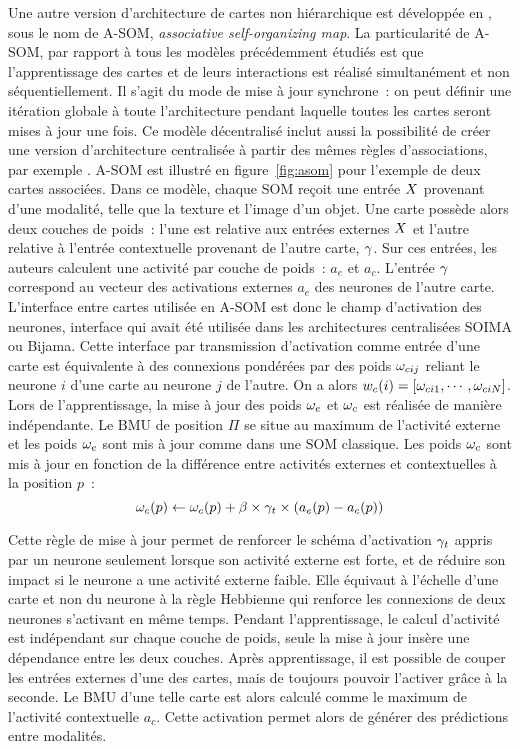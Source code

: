 \documentclass[../main]{subfiles}
\begin{document}
Une autre version d'architecture de cartes non hiérarchique est développée en \cite{johnsson_associating_2008,johnsson_associative_2009}, sous le nom de A-SOM, \emph{associative self-organizing map}. 
La particularité de A-SOM, par rapport à tous les modèles précédemment étudiés est que l'apprentissage des cartes et de leurs interactions est réalisé simultanément et non séquentiellement. Il s'agit du mode de mise à jour synchrone~: on peut définir une itération globale à toute l'architecture pendant laquelle toutes les cartes seront mises à jour une fois.
Ce modèle décentralisé inclut aussi la possibilité de créer une version d'architecture centralisée à partir des mêmes règles d'associations, par exemple \cite{buonamente_hierarchies_2016}. A-SOM est illustré en figure~\ref{fig:asom} pour l'exemple de deux cartes associées. 
Dans ce modèle, chaque SOM reçoit une entrée $X$ provenant d'une modalité, telle que la texture et l'image d'un objet.
Une carte possède alors deux couches de poids~: l'une est relative aux entrées externes $X$ et l'autre relative à l'entrée contextuelle provenant de l'autre carte, $\gamma$.
Sur ces entrées, les auteurs calculent une activité par couche de poids~: $a_e$ et $a_c$.
L'entrée $\gamma$ correspond au vecteur des activations externes $a_e$ des neurones de l'autre carte.
L'interface entre cartes utilisée en A-SOM est donc le champ d'activation des neurones, interface qui avait été utilisée dans les architectures centralisées SOIMA ou Bijama. Cette interface par transmission d'activation comme entrée d'une carte est équivalente à des connexions pondérées par des poids $\omega_{cij}$ reliant le neurone $i$ d'une carte au neurone $j$ de l'autre. On a alors $w_c(i) = [\omega_{ci1}, \cdots, \omega_{ciN}]$.
Lors de l'apprentissage, la mise à jour des poids $\omega_e$ et $\omega_c$ est réalisée de manière indépendante. 
Le BMU de position $\Pi$ se situe au maximum de l'activité externe et les poids $\omega_e$ sont mis à jour comme dans une SOM classique.
Les poids $\omega_c$ sont mis à jour en fonction de la différence entre activités externes et contextuelles à la position $p$~:
$$ \omega_c(p) \leftarrow \omega_c(p) + \beta \times \gamma_t \times (a_e(p) - a_c(p))$$

Cette règle de mise à jour permet de renforcer le schéma d'activation $\gamma_t$ appris par un neurone seulement lorsque son activité externe est forte, et de réduire son impact si le neurone a une activité externe faible. Elle équivaut à l'échelle d'une carte et non du neurone à la règle Hebbienne qui renforce les connexions de deux neurones s'activant en même temps.
Pendant l'apprentissage, le calcul d'activité est indépendant sur chaque couche de poids, seule la mise à jour insère une dépendance entre les deux couches.
Après apprentissage, il est possible de couper les entrées externes d'une des cartes, mais de toujours pouvoir l'activer grâce à la seconde. Le BMU d'une telle carte est alors calculé comme le maximum de l'activité contextuelle $a_c$. Cette activation permet alors de générer des prédictions entre modalités.
\end{document}
